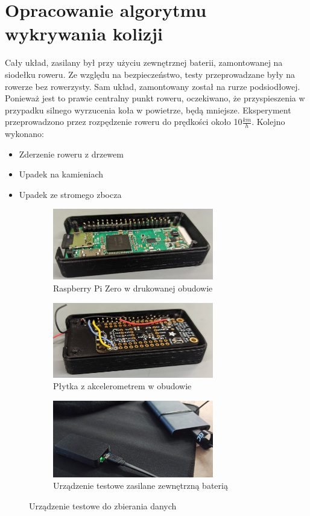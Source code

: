 \section{Opracowanie algorytmu wykrywania kolizji}
Cały układ, zasilany był przy użyciu zewnętrznej baterii, zamontowanej na siodełku roweru. Ze względu na bezpieczeństwo, testy przeprowadzane były na rowerze bez rowerzysty. Sam układ, zamontowany został na rurze podsiodłowej. Ponieważ jest to prawie centralny punkt roweru, oczekiwano, że przyspieszenia w przypadku silnego wyrzucenia koła w powietrze, będą mniejsze. Eksperyment przeprowadzono przez rozpędzenie roweru do  prędkości około 10$\frac{km}{h}$. Kolejno wykonano:
\begin{itemize}
    \item Zderzenie roweru z drzewem
    \item Upadek na kamieniach
    \item Upadek ze stromego zbocza
\end{itemize}
\begin{figure}[h]
    \centering
    \begin{subfigure}{3.5cm}
        \includegraphics[width=7cm, angle=-90]{Graphics/pi.jpg}
        \caption{Raspberry Pi Zero w drukowanej obudowie}
        \label{img:test_device_a}
    \end{subfigure}
    \begin{subfigure}{3.5cm}
        \includegraphics[width=7cm, angle=-90]{Graphics/Pi_acc.jpg}
        \caption{Płytka z akcelerometrem w obudowie}
        \label{img:test_device_b}
    \end{subfigure}
    \begin{subfigure}{3.5cm}
        \includegraphics[width=7cm, angle=-90]{Graphics/test_device.jpg}
        \caption{Urządzenie testowe zasilane zewnętrzną baterią}
        \label{img:test_device_c}
    \end{subfigure}
    \caption{Urządzenie testowe do zbierania danych}
\end{figure}

